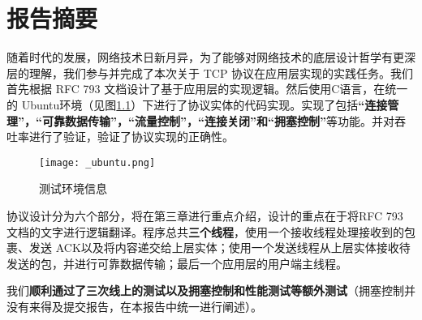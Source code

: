 \chapter{报告摘要}

随着时代的发展，网络技术日新月异，为了能够对网络技术的底层设计哲学有更深层的理解，我们参与并完成了本次关于 TCP 协议在应用层实现的实践任务。我们首先根据 RFC 793 文档设计了基于应用层的实现逻辑。然后使用C语言，在统一的 Ubuntu环境（见图\ref{fig:ubuntu}）下进行了协议实体的代码实现。实现了包括\textbf{“连接管理”，“可靠数据传输”，“流量控制”，“连接关闭”和“拥塞控制”}等功能。并对吞吐率进行了验证，验证了协议实现的正确性。

\begin{figure}[!htbp]
  \centering
  \texttt{[image: \_ubuntu.png]}
  \label{fig:ubuntu}\caption{测试环境信息}
\end{figure}

协议设计分为六个部分，将在第三章进行重点介绍，设计的重点在于将RFC 793 文档的文字进行逻辑翻译。程序总共\textbf{三个线程}，使用一个接收线程处理接收到的包裹、发送 ACK以及将内容递交给上层实体；使用一个发送线程从上层实体接收待发送的包，并进行可靠数据传输；最后一个应用层的用户端主线程。

我们\textbf{顺利通过了三次线上的测试以及拥塞控制和性能测试等额外测试}（拥塞控制并没有来得及提交报告，在本报告中统一进行阐述）。

